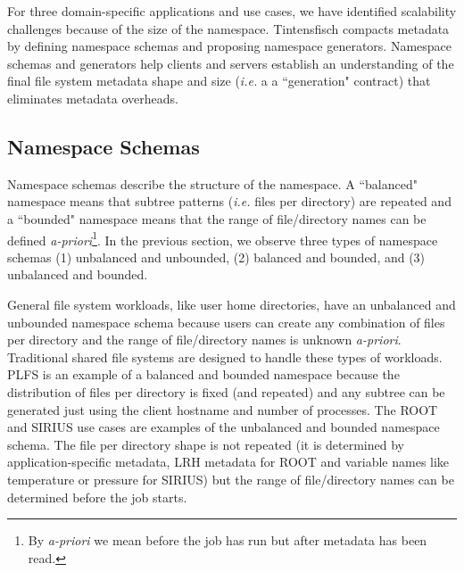  


For three domain-specific applications and use cases, we have identified
scalability challenges because of the size of the namespace.  Tintensfisch
compacts metadata by defining namespace schemas and proposing namespace
generators.  Namespace schemas and generators help clients and servers
establish an understanding of the final file system metadata shape and size
({\it i.e.} a a ``generation" contract) that eliminates metadata overheads.

\subsection{Namespace Schemas}
\label{sec:namespace-schemas}

Namespace schemas describe the structure of the namespace. A ``balanced"
namespace means that subtree patterns ({\it i.e.} files per directory) are
repeated and a ``bounded" namespace means that the range of file/directory
names can be defined {\it a-priori}\footnote{By {\it a-priori} we mean before
the job has run but after metadata has been read.}.  In the previous section,
we observe three types of namespace schemas (1) unbalanced and unbounded, (2)
balanced and bounded, and (3) unbalanced and bounded.

General file system workloads, like user home directories, have an unbalanced
and unbounded namespace schema because users can create any combination of
files per directory and the range of file/directory names is unknown {\it
a-priori}. Traditional shared file systems are designed to handle these types
of workloads. PLFS is an example of a balanced and bounded namespace because
the distribution of files per directory is fixed (and repeated) and any subtree
can be generated just using the client hostname and number of processes.  The
ROOT and SIRIUS use cases are examples of the unbalanced and bounded namespace
schema. The file per directory shape is not repeated (it is determined by
application-specific metadata, LRH metadata for ROOT and variable names like
temperature or pressure for SIRIUS) but the range of file/directory names can
be determined before the job starts.

